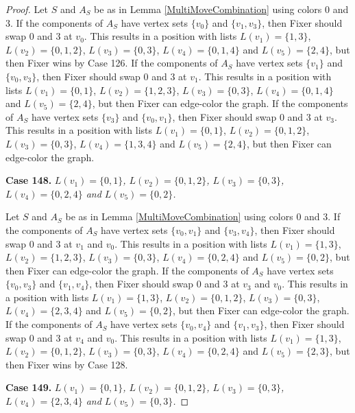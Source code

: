 \documentclass[12pt]{amsart}
\theoremstyle{plain}
\theoremstyle{definition}
\theoremstyle{remark}
\begin{document}
\begin{proof}
Let $S$ and $A_S$ be as in Lemma \ref{MultiMoveCombination} using colors $0$ and $3$. If the components of $A_S$ have vertex sets $\{v_0\}$ and $\{v_1, v_3\}$, then Fixer should swap 0 and 3 at $v_0$. This results in a position with lists $L(v_1) = \{1, 3\}$, $L(v_2) = \{0, 1, 2\}$, $L(v_3) = \{0, 3\}$, $L(v_4) = \{0, 1, 4\}$ and $L(v_5) = \{2, 4\}$, but then Fixer wins by Case 126.
If the components of $A_S$ have vertex sets $\{v_1\}$ and $\{v_0, v_3\}$, then Fixer should swap 0 and 3 at $v_1$. This results in a position with lists $L(v_1) = \{0, 1\}$, $L(v_2) = \{1, 2, 3\}$, $L(v_3) = \{0, 3\}$, $L(v_4) = \{0, 1, 4\}$ and $L(v_5) = \{2, 4\}$, but then Fixer can edge-color the graph.
If the components of $A_S$ have vertex sets $\{v_3\}$ and $\{v_0, v_1\}$, then Fixer should swap 0 and 3 at $v_3$. This results in a position with lists $L(v_1) = \{0, 1\}$, $L(v_2) = \{0, 1, 2\}$, $L(v_3) = \{0, 3\}$, $L(v_4) = \{1, 3, 4\}$ and $L(v_5) = \{2, 4\}$, but then Fixer can edge-color the graph.

\noindent\textbf{Case 148.  }\textit{$L(v_1) = \{0, 1\}$, $L(v_2) = \{0, 1, 2\}$, $L(v_3) = \{0, 3\}$, $L(v_4) = \{0, 2, 4\}$ and $L(v_5) = \{0, 2\}$.}

Let $S$ and $A_S$ be as in Lemma \ref{MultiMoveCombination} using colors $0$ and $3$. If the components of $A_S$ have vertex sets $\{v_0, v_1\}$ and $\{v_3, v_4\}$, then Fixer should swap 0 and 3 at $v_1$ and $v_0$. This results in a position with lists $L(v_1) = \{1, 3\}$, $L(v_2) = \{1, 2, 3\}$, $L(v_3) = \{0, 3\}$, $L(v_4) = \{0, 2, 4\}$ and $L(v_5) = \{0, 2\}$, but then Fixer can edge-color the graph.
If the components of $A_S$ have vertex sets $\{v_0, v_3\}$ and $\{v_1, v_4\}$, then Fixer should swap 0 and 3 at $v_3$ and $v_0$. This results in a position with lists $L(v_1) = \{1, 3\}$, $L(v_2) = \{0, 1, 2\}$, $L(v_3) = \{0, 3\}$, $L(v_4) = \{2, 3, 4\}$ and $L(v_5) = \{0, 2\}$, but then Fixer can edge-color the graph.
If the components of $A_S$ have vertex sets $\{v_0, v_4\}$ and $\{v_1, v_3\}$, then Fixer should swap 0 and 3 at $v_4$ and $v_0$. This results in a position with lists $L(v_1) = \{1, 3\}$, $L(v_2) = \{0, 1, 2\}$, $L(v_3) = \{0, 3\}$, $L(v_4) = \{0, 2, 4\}$ and $L(v_5) = \{2, 3\}$, but then Fixer wins by Case 128.

\noindent\textbf{Case 149.  }\textit{$L(v_1) = \{0, 1\}$, $L(v_2) = \{0, 1, 2\}$, $L(v_3) = \{0, 3\}$, $L(v_4) = \{2, 3, 4\}$ and $L(v_5) = \{0, 3\}$.}


\end{proof}
\end{document}

